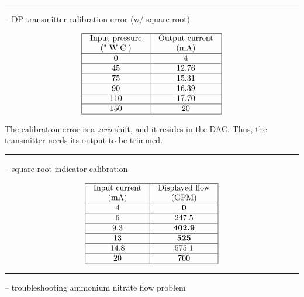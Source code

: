 \filbreak \vskip 5pt \hrule \vskip 5pt  -- DP transmitter calibration error (w/ square root) \vskip 10pt


$$\vbox{\offinterlineskip
\halign{\strut
\vrule \quad\hfil # \ \hfil & 
\vrule \quad\hfil # \ \hfil \vrule \cr
\noalign{\hrule}
%
Input pressure & Output current \cr
(" W.C.) & (mA) \cr
%
\noalign{\hrule}
%
0 & 4 \cr
%
\noalign{\hrule}
%
45 & 12.76 \cr
%
\noalign{\hrule}
%
75 & 15.31 \cr
%
\noalign{\hrule}
%
90 & 16.39 \cr
%
\noalign{\hrule}
%
110 & 17.70 \cr
%
\noalign{\hrule}
%
150 & 20 \cr
%
\noalign{\hrule}
} %
}$$ %

The calibration error is a {\it zero} shift, and it resides in the DAC.  Thus, the transmitter needs its output to be trimmed.


\filbreak \vskip 5pt \hrule \vskip 5pt  -- square-root indicator calibration \vskip 10pt


$$\vbox{\offinterlineskip
\halign{\strut
\vrule \quad\hfil # \ \hfil & 
\vrule \quad\hfil # \ \hfil \vrule \cr
\noalign{\hrule}
%
Input current & Displayed flow \cr
(mA) & (GPM) \cr
%
\noalign{\hrule}
%
4 & {\bf 0} \cr
%
\noalign{\hrule}
%
6 & 247.5 \cr
%
\noalign{\hrule}
%
9.3 & {\bf 402.9} \cr
%
\noalign{\hrule}
%
13 & {\bf 525} \cr
%
\noalign{\hrule}
%
14.8 & 575.1 \cr
%
\noalign{\hrule}
%
20 & 700 \cr
%
\noalign{\hrule}
} %
}$$ %


\filbreak \vskip 5pt \hrule \vskip 5pt  -- troubleshooting ammonium nitrate flow problem \vskip 10pt


